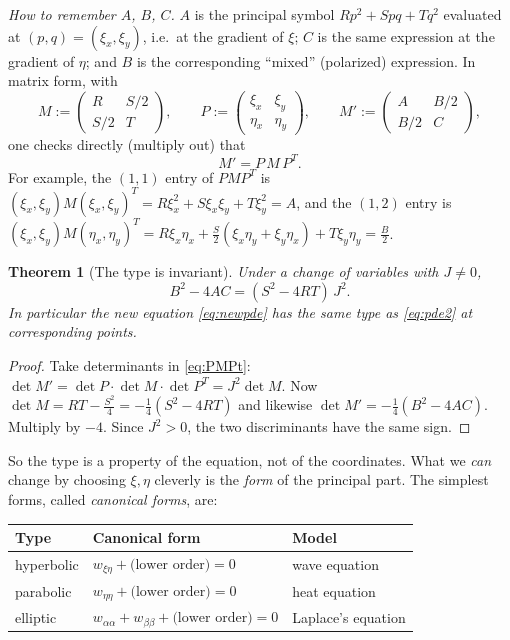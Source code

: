 \documentclass[11pt]{article}
\theoremstyle{plain}
\newtheorem{theorem}{Theorem}[section]
\theoremstyle{definition}
\theoremstyle{remark}
\begin{document}
\emph{How to remember $A$, $B$, $C$.} $A$ is the principal symbol $R p^2 + Spq + Tq^2$ evaluated at $(p,q) = (\xi_x,\xi_y)$, i.e.\ at the gradient of $\xi$; $C$ is the same expression at the gradient of $\eta$; and $B$ is the corresponding ``mixed'' (polarized) expression. In matrix form, with
$$ M := \begin{pmatrix} R & S/2 \\ S/2 & T \end{pmatrix}, \qquad P := \begin{pmatrix} \xi_x & \xi_y \\ \eta_x & \eta_y \end{pmatrix}, \qquad M' := \begin{pmatrix} A & B/2 \\ B/2 & C \end{pmatrix}, $$
one checks directly (multiply out) that
\begin{equation}\label{eq:PMPt}
M' = P\,M\,P^{T}.
\end{equation}
For example, the $(1,1)$ entry of $PMP^T$ is $(\xi_x,\xi_y)M(\xi_x,\xi_y)^T = R\xi_x^2 + S\xi_x\xi_y + T\xi_y^2 = A$, and the $(1,2)$ entry is $(\xi_x,\xi_y)M(\eta_x,\eta_y)^T = R\xi_x\eta_x + \frac S2(\xi_x\eta_y + \xi_y\eta_x) + T\xi_y\eta_y = \frac B2$.

\begin{theorem}[The type is invariant]\label{thm:typeinv}
Under a change of variables with $J \neq 0$,
$$ B^2 - 4AC = (S^2 - 4RT)\,J^2. $$
In particular the new equation \eqref{eq:newpde} has the same type as \eqref{eq:pde2} at corresponding points.
\end{theorem}
\begin{proof}
Take determinants in \eqref{eq:PMPt}: $\det M' = \det P\cdot\det M\cdot\det P^T = J^2\det M$. Now $\det M = RT - \frac{S^2}{4} = -\frac14(S^2 - 4RT)$ and likewise $\det M' = -\frac14(B^2 - 4AC)$. Multiply by $-4$. Since $J^2 > 0$, the two discriminants have the same sign.
\end{proof}

So the type is a property of the equation, not of the coordinates. What we \emph{can} change by choosing $\xi,\eta$ cleverly is the \emph{form} of the principal part. The simplest forms, called \emph{canonical forms}, are:
\begin{center}
\renewcommand{\arraystretch}{1.4}
\begin{tabular}{|l|l|l|}
\hline
\textbf{Type} & \textbf{Canonical form} & \textbf{Model} \\ \hline
hyperbolic & $w_{\xi\eta} + \text{(lower order)} = 0$ & wave equation \\ \hline
parabolic & $w_{\eta\eta} + \text{(lower order)} = 0$ & heat equation \\ \hline
elliptic & $w_{\alpha\alpha} + w_{\beta\beta} + \text{(lower order)} = 0$ & Laplace's equation \\ \hline
\end{tabular}
\end{center}
\end{document}
